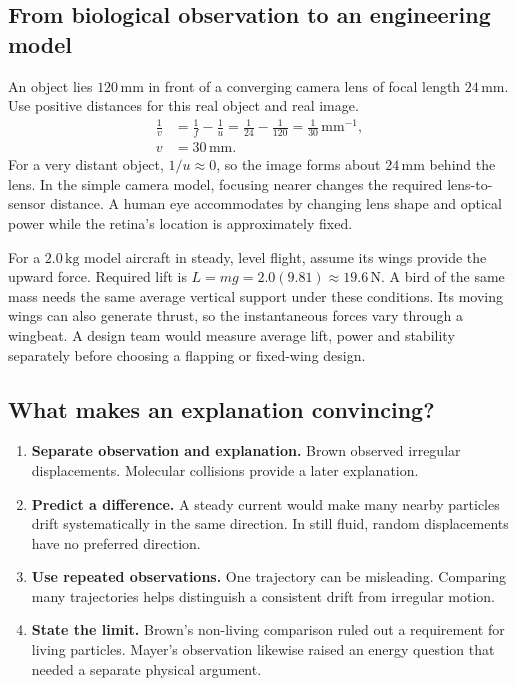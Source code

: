 \documentclass[12pt,a4paper]{article}
\begin{document}
\subsection{From biological observation to an engineering model}
\begin{tcolorbox}[examplebox, title={Work the eye--camera analogy with a thin lens}]
An object lies $120\,\mathrm{mm}$ in front of a converging camera lens of focal length $24\,\mathrm{mm}$. Use positive distances for this real object and real image.
\[
\begin{aligned}
\frac1v&=\frac1f-\frac1u
=\frac1{24}-\frac1{120}
=\frac1{30}\,\mathrm{mm}^{-1},\\
v&=30\,\mathrm{mm}.
\end{aligned}
\]
For a very distant object, $1/u\approx0$, so the image forms about $24\,\mathrm{mm}$ behind the lens. In the simple camera model, focusing nearer changes the required lens-to-sensor distance. A human eye accommodates by changing lens shape and optical power while the retina's location is approximately fixed.
\end{tcolorbox}

\begin{tcolorbox}[examplebox, title={Turn the flight comparison into a design problem}]
For a $2.0\,\mathrm{kg}$ model aircraft in steady, level flight, assume its wings provide the upward force. Required lift is $L=mg=2.0(9.81)\approx19.6\,\mathrm N$. A bird of the same mass needs the same average vertical support under these conditions. Its moving wings can also generate thrust, so the instantaneous forces vary through a wingbeat. A design team would measure average lift, power and stability separately before choosing a flapping or fixed-wing design.
\end{tcolorbox}

\subsection{What makes an explanation convincing?}
\begin{enumerate}[leftmargin=*, itemsep=2pt]
  \item \textbf{Separate observation and explanation.} Brown observed irregular displacements. Molecular collisions provide a later explanation.
  \item \textbf{Predict a difference.} A steady current would make many nearby particles drift systematically in the same direction. In still fluid, random displacements have no preferred direction.
  \item \textbf{Use repeated observations.} One trajectory can be misleading. Comparing many trajectories helps distinguish a consistent drift from irregular motion.
  \item \textbf{State the limit.} Brown's non-living comparison ruled out a requirement for living particles. Mayer's observation likewise raised an energy question that needed a separate physical argument.
\end{enumerate}
\end{document}
